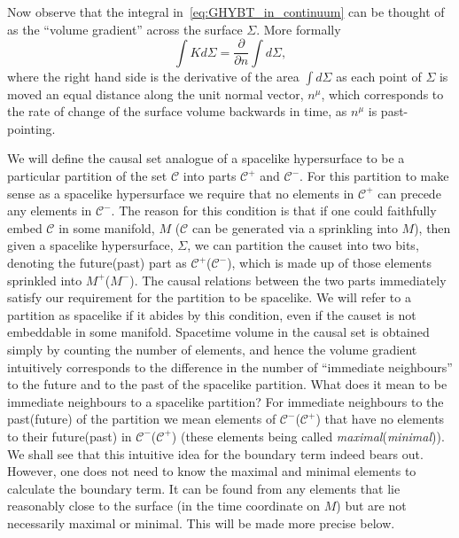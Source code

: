 \documentclass[12pt]{article}
\newcommand{\be}{\begin{equation}}
\newcommand{\ee}{\end{equation}}
\newcommand{\mb}[1]{\marginnote{\color{red}{\small MB:\,#1}}}
\begin{document}
Now observe that the integral in~\eqref{eq:GHYBT_in_continuum} can be thought of as the ``volume gradient'' across the surface $\Sigma$. More formally
\be\label{eq:normal_deriv_boundary}
\int K d\Sigma = \frac{\partial}{\partial n}\int d\Sigma,
\ee
where the right hand side is the derivative of the area $\int d\Sigma$ as each point of $\Sigma$ is moved an equal distance along the unit normal vector, $n^{\mu}$, which corresponds to the rate of change of the surface volume backwards in time, as $n^{\mu}$ is past-pointing. 
\mb{does the antichain analogy really stand?} 

We will define the causal set analogue of a spacelike hypersurface to be a particular partition of the set $\mathcal{C}$ into parts $\mathcal{C}^+$ and $\mathcal{C}^-$. For this partition to make sense as a spacelike hypersurface we require that no elements in $\mathcal{C}^+$ can precede any elements in $\mathcal{C}^-$. The reason for this condition is that if one could faithfully embed $\mathcal{C}$ in some manifold, $M$ ($\mathcal{C}$ can be generated via a sprinkling into $M$), then given a spacelike hypersurface, $\Sigma$, we can partition the causet into two bits, denoting the future(past) part as $\mathcal{C}^+$($\mathcal{C}^-$), which is made up of those elements sprinkled into $M^+$($M^-$). The causal relations between the two parts immediately satisfy our requirement for the partition to be spacelike. We will refer to a partition as spacelike if it abides by this condition, even if the causet is not embeddable in some manifold. Spacetime volume in the causal set is obtained simply by counting the number of elements, and hence the volume gradient intuitively corresponds to the difference in the number of ``immediate neighbours'' to the future and to the past of the spacelike partition. What does it mean to be immediate neighbours to a spacelike partition? For immediate neighbours to the past(future) of the partition we mean elements of $\mathcal{C}^-$($\mathcal{C}^+$) that have no elements to their future(past) in $\mathcal{C}^-$($\mathcal{C}^+$) (these elements being called \textit{maximal}(\textit{minimal})). We shall see that this intuitive idea for the boundary term indeed bears out. However, one does not need to know the maximal and minimal elements to calculate the boundary term. It can be found from any elements that lie reasonably close to the surface (in the time coordinate on $M$) but are not necessarily maximal or minimal. This will be made more precise below.
\end{document}
